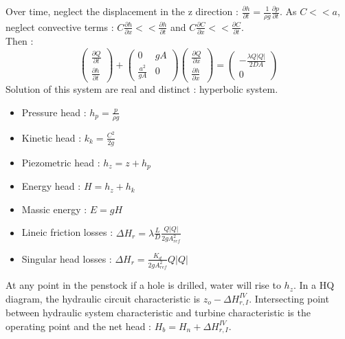 \documentclass[../main.tex]{subfiles}
\begin{document}
Over time, neglect the displacement in the z direction : $\frac{\partial h}{\partial t} = \frac{1}{\rho g} \frac{\partial p}{\partial t}$. As $C<<a$, neglect convective terms : $C\frac{\partial h}{\partial x} << \frac{\partial h}{\partial t}$ and $C\frac{\partial C}{\partial x}<< \frac{\partial C}{\partial t}$.\\

Then : \begin{equation}
    \begin{pmatrix}
        \frac{\partial Q}{\partial t}\\ \frac{\partial h}{\partial t}
    \end{pmatrix} + \begin{pmatrix}
        0 & gA\\ \frac{a^2}{gA} & 0
    \end{pmatrix} \begin{pmatrix}
        \frac{\partial Q}{\partial x} \\ \frac{\partial h}{\partial x}
    \end{pmatrix} = \begin{pmatrix}
        -\frac{\lambda Q \lvert Q\rvert}{2DA}\\ 0
    \end{pmatrix}
\end{equation}
Solution of this system are real and distinct : hyperbolic system. \\

\begin{itemize}
    \item Pressure head : $h_p = \frac{p}{\rho g}$
    \item Kinetic head : $k_k = \frac{C^2}{2g}$
    \item Piezometric head : $h_z = z+h_p$
    \item Energy head : $H = h_z+h_k$
    \item Massic energy : $E = gH$
    \item Lineic friction losses : $\Delta H_r = \lambda \frac{L}{D} \frac{Q \lvert Q\rvert}{2gA_{ref}^2}$
    \item Singular head losses : $\Delta H_r = \frac{K_d}{2gA_{ref}^2} Q \lvert Q\rvert$
\end{itemize}
\warning At any point in the penstock if a hole is drilled, water will rise to $h_z$. In a HQ diagram, the hydraulic circuit characteristic is $z_o-\Delta H_{r,I}^{IV}$. Intersecting point between hydraulic system characteristic and turbine characteristic is the operating point and the net head : $H_b = H_n + \Delta H_{r,I}^{IV}$.\\
\end{document}
